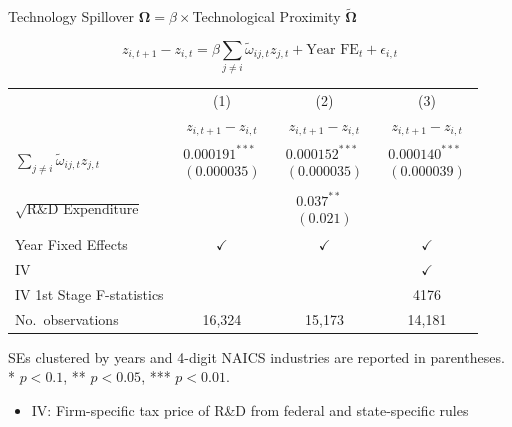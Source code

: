 \documentclass[
  10pt,
  aspectratio=169,   %
]{beamer}
\theoremstyle{plain}
\begin{document}
\begin{frame}{Technology Spillover $\bm{\Omega}=\beta\times$Technological Proximity $\bm{\widetilde{\Omega}}$ \hyperlink{first_stage}{}}
  \label{regression}
  {\footnotesize
  \vspace{-5mm}
  \[
    z_{i,t+1}-z_{i,t}
    =\beta\sum_{j\neq i}\tilde{\omega}_{ij,t}z_{j,t}
    +\text{Year FE}_{t}
    +\epsilon_{i,t}
  \]
  \begin{center}
    \setlength{\tabcolsep}{6pt} %
    \begin{tabular}{lccc}
      \hline\hline
      & (1) & (2) & (3) \\
      & $z_{i,t+1}-z_{i,t}$
      & $z_{i,t+1}-z_{i,t}$
      & $z_{i,t+1}-z_{i,t}$ \\
      \hline
      $\sum_{j\neq i}\tilde{\omega}_{ij,t}z_{j,t}$
      & $\begin{array}{c}\text{0.000191}^{***}\\(\text{0.000035})\end{array}$
      & $\begin{array}{c}\text{0.000152}^{***}\\(\text{0.000035})\end{array}$
      & $\begin{array}{c}\text{0.000140}^{***}\\(\text{0.000039})\end{array}$ \\
      $\sqrt{\text{R\&D Expenditure}}$
      &
      & $\begin{array}{c}\text{0.037}^{**}\\(\text{0.021})\end{array}$
      &  \\
      \hline
      Year Fixed Effects                & $\checkmark$ & $\checkmark$ & $\checkmark$ \\
      IV                                &              &              & $\checkmark$ \\
      IV 1st Stage F-statistics         &              &              & 4176         \\
      No.\ observations                 & 16,324       & 15,173       & 14,181       \\
      \hline\hline
    \end{tabular}
  \end{center}
  SEs clustered by years and 4-digit NAICS industries are reported in parentheses.
  {*} $p<\text{0.1}$, {**} $p<\text{0.05}$, {***} $p<\text{0.01}$.}
  \begin{itemize}
    \item IV: Firm-specific tax price of R\&D from federal and state-specific rules \citep{Bloom2013-pn}
  \end{itemize}
\end{frame}
\end{document}
